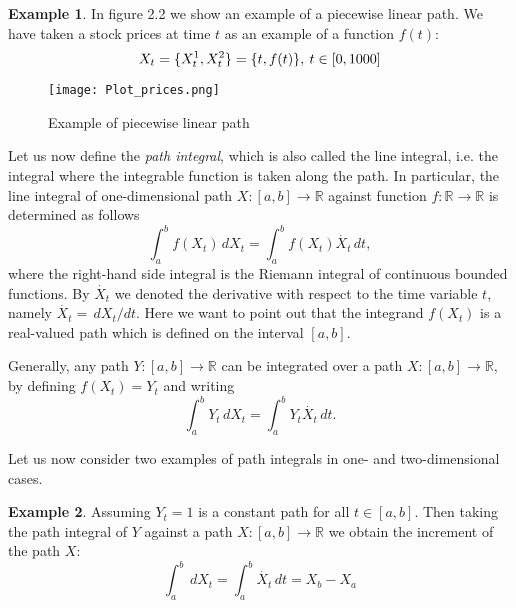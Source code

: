 \documentclass[12pt,a4paper]{report}
\theoremstyle{definition}
\newtheorem{example}{Example}
\begin{document}
\begin{example}
	In figure 2.2 we show an example of a piecewise linear path. We have taken a  stock prices at time $t$ as an example of a function $f(t)$: 
	\begin{equation}
		X_t=\{X_t^1,X_t^2\}=\{t, f(t)\}, \: t\in [0,1000]\\
	\end{equation}
	\begin{figure}[!htbp]
			\texttt{[image: Plot\_prices.png]}
			\caption{Example of piecewise linear path}
			\label{fig:prices}
	\end{figure}
\end{example}
Let us now define the \textit{path integral}, which is also called the line integral, i.e. the integral where the integrable function is taken along the path. In particular, the line integral of one-dimensional path $X:[a,b]\rightarrow\mathbb{R}$ against function $f:\mathbb{R}\rightarrow\mathbb{R}$ is determined as follows
\begin{equation}
	\int_{a}^{b} f(X_t)\,dX_t=\int_{a}^{b} f(X_t)\dot{X_t}\,dt,
\end{equation}
where the right-hand side integral is the Riemann integral of continuous bounded functions. By $\dot{X_t}$ we denoted the derivative with respect to the time variable $t$, namely $\dot{X_t} =\,dX_t/dt$. Here we want to point out that the integrand $f(X_t)$ is a real-valued path which is defined on the interval $[a,b]$. 

Generally, any path $Y:[a,b]\rightarrow\mathbb{R}$  can be integrated over a path $X:[a,b]\rightarrow\mathbb{R}$, by defining $f(X_t)=Y_t$ and writing
\begin{equation}
	\int_{a}^{b} Y_t\,dX_t=\int_{a}^{b} Y_t\dot{X_t}\,dt.
\end{equation}

Let us now consider two examples of path integrals in one- and two-dimensional cases. 
\begin{example}
	Assuming $Y_t = 1$ is a constant path for all $t\in[a,b]$. Then taking the path integral of $Y$ against a path $X:[a,b]\rightarrow\mathbb{R}$ we obtain the increment of the path $X$:
	\begin{equation}
		\int_{a}^{b}\,dX_t=\int_{a}^{b}\dot{X_t}\,dt=X_b-X_a
	\end{equation}
\end{example}
\end{document}
